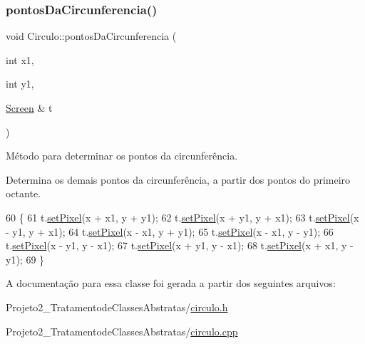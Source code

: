 \subsubsection{\texorpdfstring{pontos\+Da\+Circunferencia()}{pontosDaCircunferencia()}}
{\footnotesize\ttfamily void Circulo\+::pontos\+Da\+Circunferencia (\begin{DoxyParamCaption}\item[{int}]{x1,  }\item[{int}]{y1,  }\item[{\mbox{\hyperlink{class_screen}{Screen}} \&}]{t }\end{DoxyParamCaption})}



Método para determinar os pontos da circunferência. 

Determina os demais pontos da circunferência, a partir dos pontos do primeiro octante. 
\begin{DoxyCode}
60                                                              \{
61     t.\mbox{\hyperlink{class_screen_ae6bea81c57a22d226507c3c26fa95ee0}{setPixel}}(x + x1, y + y1);
62     t.\mbox{\hyperlink{class_screen_ae6bea81c57a22d226507c3c26fa95ee0}{setPixel}}(x + y1, y + x1);
63     t.\mbox{\hyperlink{class_screen_ae6bea81c57a22d226507c3c26fa95ee0}{setPixel}}(x - y1, y + x1);
64     t.\mbox{\hyperlink{class_screen_ae6bea81c57a22d226507c3c26fa95ee0}{setPixel}}(x - x1, y + y1);
65     t.\mbox{\hyperlink{class_screen_ae6bea81c57a22d226507c3c26fa95ee0}{setPixel}}(x - x1, y - y1);
66     t.\mbox{\hyperlink{class_screen_ae6bea81c57a22d226507c3c26fa95ee0}{setPixel}}(x - y1, y - x1);
67     t.\mbox{\hyperlink{class_screen_ae6bea81c57a22d226507c3c26fa95ee0}{setPixel}}(x + y1, y - x1);
68     t.\mbox{\hyperlink{class_screen_ae6bea81c57a22d226507c3c26fa95ee0}{setPixel}}(x + x1, y - y1);
69 \}
\end{DoxyCode}


A documentação para essa classe foi gerada a partir dos seguintes arquivos\+:\begin{DoxyCompactItemize}
\item 
Projeto2\+\_\+\+Tratamentode\+Classes\+Abstratas/\mbox{\hyperlink{circulo_8h}{circulo.\+h}}\item 
Projeto2\+\_\+\+Tratamentode\+Classes\+Abstratas/\mbox{\hyperlink{circulo_8cpp}{circulo.\+cpp}}\end{DoxyCompactItemize}
